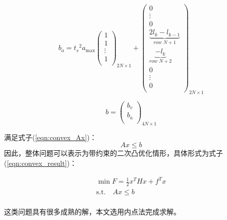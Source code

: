 \begin{equation}
    b_a={t_s}^2a_{\max}\left( \begin{array}{c}
        1\\
        1\\
        \vdots\\
        1\\
    \end{array} \right) _{2N\times 1}+\left( \begin{array}{c}
        0\\
        \vdots\\
        0\\
        \underset{row\,\,N+1}{\underbrace{2l_k-l_{k-1}}}\\
        \underset{row\,\,N+2}{\underbrace{-l_k}}\\
        0\\
        \vdots\\
        0\\
    \end{array} \right) _{2N\times 1}
\end{equation}

\begin{equation}
    b=\left( \begin{array}{c}
        b_v\\
        b_a\\
    \end{array} \right) _{4N\times 1}
    \label{eqn:convex_b}
\end{equation}

满足式子(\ref{eqn:convex_Ax})：
\begin{equation}
    {Ax}\le {b}
    \label{eqn:convex_Ax}
\end{equation}
因此，整体问题可以表示为带约束的二次凸优化情形，具体形式为式子(\ref{eqn:convex_result})：

\begin{equation}
    \begin{array}{c}
        \min  F=\frac{1}{2}x^THx+f^Tx\\
        \mathrm{s}.\mathrm{t}.\quad Ax\le b\\
    \end{array}
    \label{eqn:convex_result}
\end{equation}

这类问题具有很多成熟的解，本文选用内点法完成求解。

\FloatBarrier
